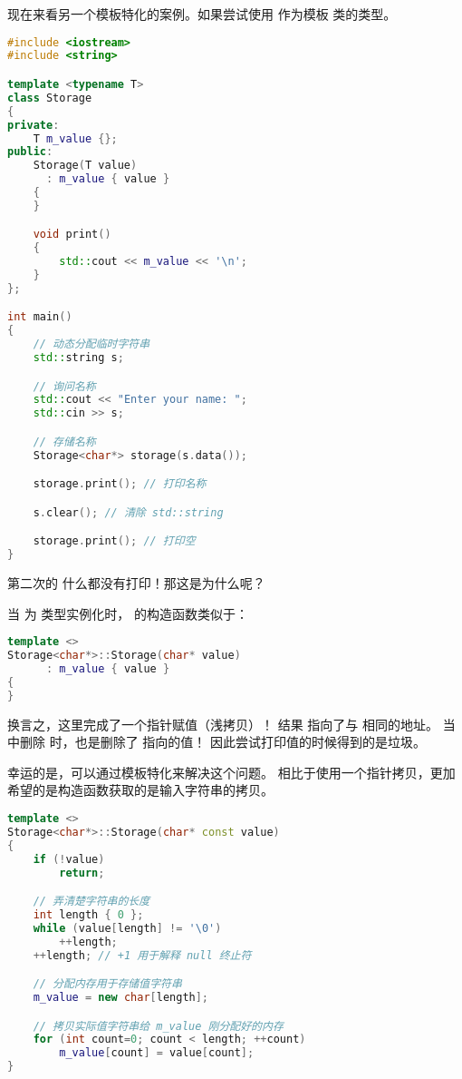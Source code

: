 \documentclass[../../LearnCpp.tex]{subfiles}
\begin{document}
现在来看另一个模板特化的案例。如果尝试使用  作为模板  类的类型。

\begin{lstlisting}[language=C++]
#include <iostream>
#include <string>

template <typename T>
class Storage
{
private:
    T m_value {};
public:
    Storage(T value)
      : m_value { value }
    {
    }

    void print()
    {
        std::cout << m_value << '\n';
    }
};

int main()
{
    // 动态分配临时字符串
    std::string s;

    // 询问名称
    std::cout << "Enter your name: ";
    std::cin >> s;

    // 存储名称
    Storage<char*> storage(s.data());

    storage.print(); // 打印名称

    s.clear(); // 清除 std::string

    storage.print(); // 打印空
}
\end{lstlisting}

第二次的  什么都没有打印！那这是为什么呢？

当  为  类型实例化时， 的构造函数类似于：

\begin{lstlisting}[language=C++]
template <>
Storage<char*>::Storage(char* value)
      : m_value { value }
{
}
\end{lstlisting}

换言之，这里完成了一个指针赋值（浅拷贝）！
结果  指向了与  相同的地址。
当  中删除  时，也是删除了  指向的值！
因此尝试打印值的时候得到的是垃圾。

幸运的是，可以通过模板特化来解决这个问题。
相比于使用一个指针拷贝，更加希望的是构造函数获取的是输入字符串的拷贝。

\begin{lstlisting}[language=C++]
template <>
Storage<char*>::Storage(char* const value)
{
    if (!value)
        return;

    // 弄清楚字符串的长度
    int length { 0 };
    while (value[length] != '\0')
        ++length;
    ++length; // +1 用于解释 null 终止符

    // 分配内存用于存储值字符串
    m_value = new char[length];

    // 拷贝实际值字符串给 m_value 刚分配好的内存
    for (int count=0; count < length; ++count)
        m_value[count] = value[count];
}
\end{lstlisting}
\end{document}
